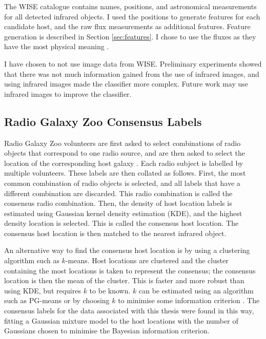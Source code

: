    The WISE catalogue contains names, positions, and astronomical measurements for all detected infrared objects. I used the positions to generate features for each candidate host, and the raw flux measurements as additional features. Feature generation is described in Section \ref{sec:features}. I chose to use the fluxes as they have the most physical meaning .

    I have chosen to not use image data from WISE. Preliminary experiments showed that there was not much information gained from the use of infrared images, and using infrared images made the classifier more complex. Future work may use infrared images to improve the classifier.

  \subsection{Radio Galaxy Zoo Consensus Labels}
  \label{sec:consensuses}

    
    Radio Galaxy Zoo volunteers are first asked to select combinations of radio
    objects that correspond to one radio source, and are then asked to select
    the location of the corresponding host galaxy \citep{banfield15}. Each
    radio subject is labelled by multiple volunteers. These labels are then
    collated as follows. First, the most common combination of radio objects is
    selected, and all labels that have a different combination are discarded.
    This radio combination is called the consensus radio combination. Then, the
    density of host location labels is estimated using Gaussian kernel density
    estimation (KDE), and the highest density location is selected. This is
    called the consensus host location. The consensus host location is then
    matched to the nearest infrared object.

    An alternative way to find the consensus host location is by using a
    clustering algorithm such as $k$-means. Host locations are clustered and
    the cluster containing the most locations is taken to represent the
    consensus; the consensus location is then the mean of the cluster. This is
    faster and more robust than using KDE, but requires $k$ to be known. $k$
    can be estimated using an algorithm such as PG-means \citep{hamerly07} or by
    choosing $k$ to minimise some information criterion .
    The consensus labels for the data associated with this thesis were found in
    this way, fitting a Gaussian mixture model to the host locations with the
    number of Gaussians chosen to minimise the Bayesian information criterion.

